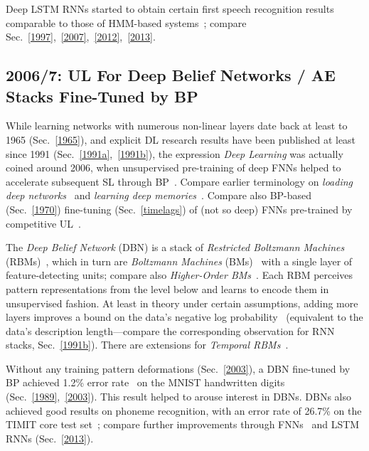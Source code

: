 \documentclass[letterpaper]{article}
\begin{document}
\begin{sloppypar}
Deep LSTM RNNs started to obtain certain first speech recognition results comparable to those of 
HMM-based systems~\citep{graves+eck+beringer+schmidhuber:2003}; compare Sec.~\ref{1997},~\ref{2007},~\ref{2012},~\ref{2013}. 




\subsection{2006/7: UL For Deep Belief Networks  / AE Stacks Fine-Tuned by BP}
\label{2006}

While learning networks with numerous non-linear layers
date back at least to 1965 (Sec.~\ref{1965}),
and explicit DL research results have been published at least since 1991 (Sec.~\ref{1991a},~\ref{1991b}), 
the expression {\em Deep Learning}  was actually 
coined around 2006, 
when   unsupervised pre-training of deep FNNs helped 
to accelerate subsequent SL through BP~\citep{HinSal06,hinton:06afast}.
Compare earlier terminology on {\em loading deep networks}~\citep{sima1994,windisch2005} 
and {\em learning deep memories}~\citep{Gomez:05gecco}. 
Compare also BP-based (Sec.~\ref{1970}) fine-tuning (Sec.~\ref{timelags}) of (not so deep) FNNs 
pre-trained by competitive UL~\citep{maclin1995}.

The {\em Deep Belief Network} (DBN) is a  
stack of {\em Restricted Boltzmann Machines} (RBMs)~\citep{smolensky86}, 
which in turn are {\em Boltzmann Machines} (BMs)~\citep{HintonSejnowski:86} 
with a single layer of feature-detecting units;
compare also {\em Higher-Order BMs}~\citep{memisevic2010}.
Each RBM perceives pattern representations from the level below and learns to encode
them in unsupervised fashion.
At least in theory under certain assumptions, 
adding more layers improves a bound on the data's negative log probability~\citep{hinton:06afast} 
(equivalent to the data's 
description length---compare the corresponding observation for RNN stacks, Sec.~\ref{1991b}).  
There are extensions for {\em Temporal RBMs}~\citep{sutskever2008}.


Without any training pattern deformations (Sec.~\ref{2003}),
a DBN fine-tuned by BP
achieved 1.2\% error rate~\citep{HinSal06} on the MNIST handwritten digits
(Sec.~\ref{1989},~\ref{2003}).
This result 
helped to arouse interest in DBNs. 
DBNs  also achieved good results on phoneme recognition,
with an error rate of 26.7\% on the
TIMIT core test set~\citep{mohamed2010};
compare further improvements through FNNs~\citep{speech2012,lideng2014}
and LSTM RNNs (Sec.~\ref{2013}).  


\end{sloppypar}
\end{document}
